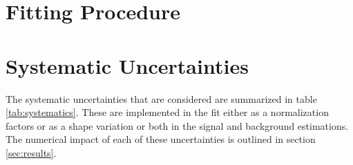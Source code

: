 \documentclass[NOTE, atlasdraft=true, texlive=2016, UKenglish]{\ATLASLATEXPATH atlasdoc}
\begin{document}
\section{Fitting Procedure}
\label{sec:fit}




\section{Systematic Uncertainties}
\label{sec:sys}

The systematic uncertainties that are considered are summarized in table \ref{tab:systematics}. These are implemented in the fit either as a normalization factors or as a shape variation or both in the signal and background estimations. The numerical impact of each of these uncertainties is outlined in section \ref{sec:results}.
\end{document}
